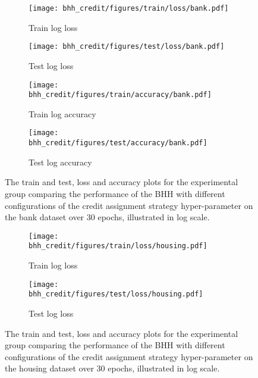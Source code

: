 \begin{figure}[htbp]
	\begin{subfigure}{0.5\textwidth}
		\centering
		\texttt{[image: bhh\_credit/figures/train/loss/bank.pdf]}
		\caption{Train log loss}
		\label{fig:results:credit:figures:loss:train:bank}
	\end{subfigure}
	\begin{subfigure}{0.5\textwidth}
		\centering
		\texttt{[image: bhh\_credit/figures/test/loss/bank.pdf]}
		\caption{Test log loss}
		\label{fig:results:credit:figures:loss:test:bank}
	\end{subfigure}
	\par\bigskip
	\begin{subfigure}{0.5\textwidth}
		\centering
		\texttt{[image: bhh\_credit/figures/train/accuracy/bank.pdf]}
		\caption{Train log accuracy}
		\label{fig:results:credit:figures:accuracy:train:bank}
	\end{subfigure}
	\begin{subfigure}{0.5\textwidth}
		\centering
		\texttt{[image: bhh\_credit/figures/test/accuracy/bank.pdf]}
		\caption{Test log accuracy}
		\label{fig:results:credit:figures:accuracy:test:bank}
	\end{subfigure}
	\par\bigskip
	\caption{The train and test, loss and accuracy plots for the experimental group comparing the performance of the \acs{BHH} with different configurations of the credit assignment strategy hyper-parameter on the bank dataset over 30 epochs, illustrated in log scale.}
	\label{fig:results:credit:figures:bank}
\end{figure}

\begin{figure}[htbp]
	\begin{subfigure}{0.5\textwidth}
		\centering
		\texttt{[image: bhh\_credit/figures/train/loss/housing.pdf]}
		\caption{Train log loss}
		\label{fig:results:credit:figures:loss:train:housing}
	\end{subfigure}
	\begin{subfigure}{0.5\textwidth}
		\centering
		\texttt{[image: bhh\_credit/figures/test/loss/housing.pdf]}
		\caption{Test log loss}
		\label{fig:results:credit:figures:loss:test:housing}
	\end{subfigure}
	\par\bigskip
	\caption{The train and test, loss and accuracy plots for the experimental group comparing the performance of the \acs{BHH} with different configurations of the credit assignment strategy hyper-parameter on the housing dataset over 30 epochs, illustrated in log scale.}
	\label{fig:results:credit:figures:housing}
\end{figure}

